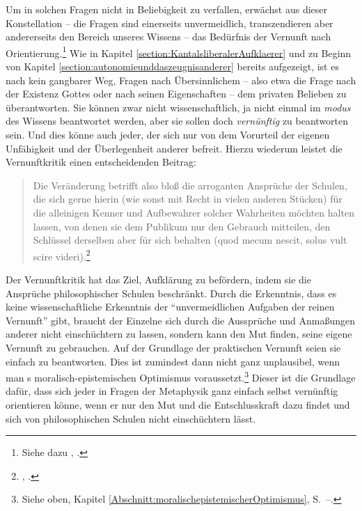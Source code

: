 Um in solchen Fragen nicht in Beliebigkeit zu verfallen, erwächst aus dieser
Konstellation -- die Fragen sind einerseits unvermeidlich, transzendieren aber
andererseits den Bereich unseres Wissens -- das Bedürfnis der Vernunft nach
Orientierung.\footnote{Siehe dazu
\cite[][A 309--311]{Kant:Washeisst:SichimDenkenorientieren?1977}, \cite[][VIII:
136.1--137.3]{Kant:GesammelteWerke1900ff.}.} Wie in Kapitel
\ref{section:KantalsliberalerAufklaerer} und zu Beginn von Kapitel
\ref{section:autonomieunddaszeugnisanderer} bereits aufgezeigt, ist es nach
 kein gangbarer Weg, Fragen nach Übersinnlichem -- also
etwa die Frage nach der Existenz Gottes oder nach seinen Eigenschaften -- dem
privaten Belieben zu überantworten.
Sie können zwar nicht wissenschaftlich, ja nicht einmal im \emph{modus} des Wissens beantwortet
werden, aber sie sollen doch \emph{vernünftig} zu beantworten sein. Und dies
könne auch jeder, der sich nur von dem Vorurteil der eigenen Unfähigkeit und der
Überlegenheit anderer befreit. Hierzu wiederum leistet die Vernunftkritik einen
entscheidenden Beitrag:
\begin{quote}
Die Veränderung betrifft also bloß die arroganten Ansprüche der Schulen, die
sich gerne hierin (wie sonst mit Recht in vielen anderen Stücken) für die
alleinigen Kenner und Aufbewahrer solcher Wahrheiten möchten halten lassen, von
denen sie dem Publikum nur den Gebrauch mitteilen, den Schlüssel derselben aber
für sich behalten (quod mecum nescit, solus vult scire
videri).\footnote{\cite[][B xxxiii]{Kant:KritikderreinenVernunft2003},
\cite[][III: 20.28--33]{Kant:GesammelteWerke1900ff.}.}
\end{quote}
Der Vernunftkritik hat das Ziel, Aufklärung zu befördern, indem sie die
Ansprüche philosophischer Schulen beschränkt. Durch die Erkenntnis, dass es
keine wissenschaftliche Erkenntnis der \enquote{unvermeidlichen Aufgaben der
reinen Vernunft} gibt, braucht der Einzelne sich durch die Aussprüche und
Anmaßungen anderer nicht einschüchtern zu lassen, sondern kann den Mut finden,
seine eigene Vernunft zu gebrauchen. Auf der Grundlage der praktischen Vernunft
seien sie einfach zu beantworten. Dies ist zumindest dann nicht ganz unplausibel, wenn man
s moralisch-epistemischen Optimismus
voraussetzt.\footnote{Siehe oben, Kapitel
\ref{Abschnitt:moralischepistemischerOptimismus},
S.~\pageref{Abschnitt:moralischepistemischerOptimismus}--\pageref{Abschnitt:moralischepistemischerOptimismus-Ende}.}
Dieser ist die Grundlage dafür, dass sich jeder in Fragen der Metaphysik ganz
einfach selbst vernünftig orientieren könne, wenn er nur den Mut und die
Entschlusskraft dazu findet und sich von philosophischen Schulen nicht
einschüchtern lässt.

